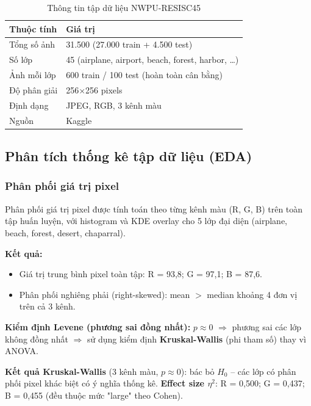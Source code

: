 \documentclass[12pt,a4paper]{article}
\let\oldtextbf\textbf
\renewcommand{\textbf}[1]{\oldtextbf{\textcolor{hcmublue}{#1}}}
\begin{document}
\begin{table}[H]
\centering
\begin{tabular}{|l|l|}
\hline
\textbf{Thuộc tính} & \textbf{Giá trị} \\ \hline
Tổng số ảnh & 31.500 (27.000 train + 4.500 test) \\ \hline
Số lớp & 45 (airplane, airport, beach, forest, harbor, \ldots) \\ \hline
Ảnh mỗi lớp & 600 train / 100 test (hoàn toàn cân bằng) \\ \hline
Độ phân giải & 256$\times$256 pixels \\ \hline
Định dạng & JPEG, RGB, 3 kênh màu \\ \hline
Nguồn & Kaggle \\ \hline
\end{tabular}
\caption{Thông tin tập dữ liệu NWPU-RESISC45}
\label{tab:img_dataset}
\end{table}

\subsection{Phân tích thống kê tập dữ liệu (EDA)}

\subsubsection{Phân phối giá trị pixel}

Phân phối giá trị pixel được tính toán theo từng kênh màu (R, G, B) trên toàn tập huấn luyện, với histogram và KDE overlay cho 5 lớp đại diện (airplane, beach, forest, desert, chaparral).

\textbf{Kết quả:}
\begin{itemize}
    \item Giá trị trung bình pixel toàn tập: R = 93,8; G = 97,1; B = 87,6.
    \item Phân phối nghiêng phải (right-skewed): mean $>$ median khoảng 4 đơn vị trên cả 3 kênh.
\end{itemize}

\textbf{Kiểm định Levene (phương sai đồng nhất):} $p \approx 0$ $\Rightarrow$ phương sai các lớp không đồng nhất $\Rightarrow$ sử dụng kiểm định \textbf{Kruskal-Wallis} (phi tham số) thay vì ANOVA.

\textbf{Kết quả Kruskal-Wallis} (3 kênh màu, $p \approx 0$): bác bỏ $H_0$ -- các lớp có phân phối pixel khác biệt có ý nghĩa thống kê. \textbf{Effect size $\eta^2$}: R = 0,500; G = 0,437; B = 0,455 (đều thuộc mức "large" theo Cohen).
\end{document}
